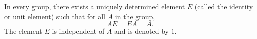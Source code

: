 In every group, there exists a uniquely determined element $E$ (called the identity or unit element) such that for all $A$ in the group,
$$AE = EA = A.$$
The element $E$ is independent of $A$ and is denoted by $1$.
